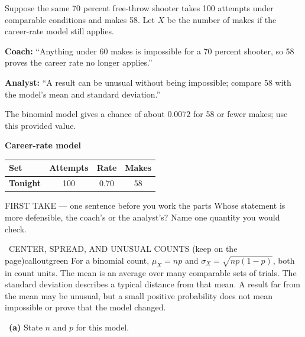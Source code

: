 \documentclass[11pt]{article}
\begin{document}
\clearpage
{}

Suppose the same 70 percent free-throw shooter takes 100 attempts under comparable conditions and makes 58. Let $X$ be the number of makes if the career-rate model still applies.\par\smallskip \textbf{Coach:} ``Anything under 60 makes is impossible for a 70 percent shooter, so 58 proves the career rate no longer applies.''\par \textbf{Analyst:} ``A result can be unusual without being impossible; compare 58 with the model's mean and standard deviation.''\par The binomial model gives a chance of about $0.0072$ for 58 or fewer makes; use this provided value.\par
\begin{center}
\textbf{Career-rate model}\par\smallskip
\begin{tabular}{|l|c|c|c|}
\hline
\textbf{Set} & \textbf{Attempts} & \textbf{Rate} & \textbf{Makes} \\ \hline
\textbf{Tonight} & 100 & 0.70 & 58 \\ \hline
\end{tabular}
\end{center}
\begin{firsttakebox}{FIRST TAKE --- one sentence before you work the parts}
Whose statement is more defensible, the coach's or the analyst's? Name one quantity you would check.\par
{}
\end{firsttakebox}

\begin{callout}{\IconBook\ CENTER, SPREAD, AND UNUSUAL COUNTS (keep on the page)}{calloutgreen}
For a binomial count, $\mu_X=np$ and $\sigma_X=\sqrt{np(1-p)}$, both in count units. The mean is an average over many comparable sets of trials. The standard deviation describes a typical distance from that mean. A result far from the mean may be unusual, but a small positive probability does not mean impossible or prove that the model changed.
\end{callout}

~\textbf{(a)} State $n$ and $p$ for this model.\par
{}
\end{document}
